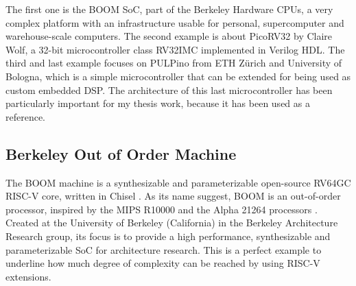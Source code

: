 The first one is the BOOM \cite{zhaosonicboom} SoC, part of the Berkeley Hardware CPUs, a very complex platform with an infrastructure usable for personal, supercomputer and warehouse-scale computers. The second example is about PicoRV32 \cite{picorv32} by Claire Wolf, a 32-bit microcontroller class RV32IMC implemented in Verilog HDL. The third and last example focuses on PULPino \cite{pulpino} from ETH Zürich and University of Bologna, which is a simple microcontroller that can be extended for being used as custom embedded DSP. The architecture of this last microcontroller has been particularly important for my thesis work, because it has been used as a reference.

\subsection{Berkeley Out of Order Machine}
The BOOM machine is a synthesizable and parameterizable open-source RV64GC RISC-V core, written in Chisel \cite{chisel}. As its name suggest, BOOM is an out-of-order processor, inspired by the MIPS R10000 \cite{491460} and the Alpha 21264 \cite{755465} processors . Created at the University of Berkeley (California) in the Berkeley Architecture Research group, its focus is to provide a high performance, synthesizable and parameterizable SoC for architecture research. This is a perfect example to underline how much degree of complexity can be reached by using RISC-V extensions.

